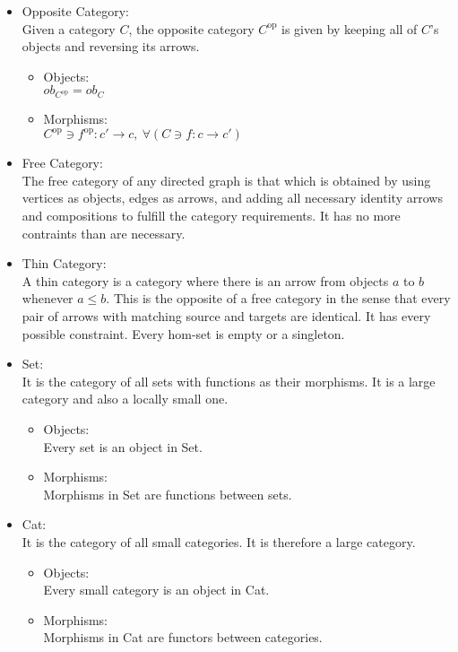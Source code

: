 \begin{itemize}
  \item Opposite Category:\\
    Given a category $C$, the opposite category $C^\mathrm{op}$ is given by
    keeping all of $C$'s objects and reversing its arrows.
    \parencite{maclane:working_mathematician}
    \begin{itemize}
      \item Objects:\\
        $ob_{C^\mathrm{op}} = ob_C$
      \item Morphisms:\\
        $C^{\mathrm{op}} \ni f^{\mathrm{op}} : c' \to c,
          \ \forall (C \ni f : c \to c')$
    \end{itemize}

  \item Free Category:\\
    The free category of any directed graph is that which is obtained by using
    vertices as objects, edges as arrows, and adding all necessary identity
    arrows and compositions to fulfill the category requirements. It has no
    more contraints than are necessary.

  \item Thin Category:\\
    A thin category is a category where there is an arrow from objects $a$ to
    $b$ whenever $a \leq b$. This is the opposite of a free category in the
    sense that every pair of arrows with matching source and targets are
    identical. It has every possible constraint. Every hom-set is empty or a
    singleton.

  \item Set:\\
    It is the category of all sets with functions as their morphisms.
    It is a large category and also a locally small one. \parencite{awodey:category_theory}
    \begin{itemize}
      \item Objects:\\
        Every set is an object in Set.
      \item Morphisms:\\
        Morphisms in Set are functions between sets.
    \end{itemize}

  \item Cat:\\
    It is the category of all small categories. It is therefore a large category.
    \parencite{nlab:cat}
    \begin{itemize}
      \item Objects:\\
        Every small category is an object in Cat.
      \item Morphisms:\\
        Morphisms in Cat are functors between categories.
    \end{itemize}
\end{itemize}
